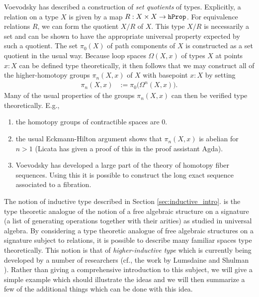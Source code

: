 \documentclass[11pt]{amsart}
\newcommand{\hprop}{\textnormal{\texttt{hProp}}}
\theoremstyle{definition}
\theoremstyle{remark}
\numberwithin{equation}{section}
\begin{document}
Voevodsky \cite{Vo2012a} has described a construction of \emph{set quotients}
of types.  Explicitly, a relation on a type $X$ is given by a map
$R:X\times X\to\hprop$.  For equivalence relations $R$, we can form
the quotient $X/R$ of $X$.  This type $X/R$ is necessarily a set and
can be shown to have the appropriate universal property expected by
such a quotient.  The set $\pi_{0}(X)$ of path components of $X$ is
constructed as a set quotient in the usual way.  Because loop spaces
$\Omega(X,x)$ of types $X$ at points $x:X$ can be defined type
theoretically, it then follows that we may construct all of the
higher-homotopy groups $\pi_{n}(X,x)$ of $X$ with basepoint $x:X$ by
setting 
\begin{align*}
  \pi_{n}(X,x) & := \pi_{0}\bigl(\Omega^{n}(X,x)\bigr).
\end{align*}
Many of the usual properties of the groups $\pi_{n}(X,x)$ can then be
verified type theoretically.  E.g.,
\begin{enumerate}
\item the homotopy groups of contractible spaces are $0$.
\item the usual Eckmann-Hilton \cite{Eckmann:1961tx} argument shows that $\pi_{n}(X,x)$ is abelian for $n>1$
  (Licata \cite{Licata} has given a proof of this in the proof assistant Agda).
\item Voevodsky has developed a large part of the theory of homotopy
  fiber sequences.  Using this it is possible to construct the long
  exact sequence associated to a fibration.
\end{enumerate}

The notion of inductive type described in Section \ref{sec:inductive_intro}. is the type
theoretic analogue of the notion of a free algebraic structure on
a signature (a list of generating operations together with their
arities) as studied in universal algebra.  By considering a type
theoretic analogue of free algebraic structures on a signature subject to
relations, it is possible to describe many familiar spaces type
theoretically.  This notion is that of \emph{higher-inductive
  type} which is currently being developed by a number of researchers
(cf., the work by Lumsdaine and Shulman \cite{Lumsdaine:HIT,Shulman:HTTVI}).
Rather than giving a comprehensive introduction to this
subject, we will give a simple example which should illustrate the
ideas and we will then summarize a few of the additional things which
can be done with this idea.
\end{document}
